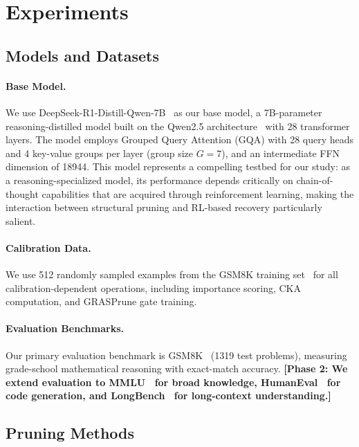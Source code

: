 
\section{Experiments}

\subsection{Models and Datasets}

\paragraph{Base Model.}
We use DeepSeek-R1-Distill-Qwen-7B~\citep{deepseek2025r1} as our base model, a 7B-parameter reasoning-distilled model built on the Qwen2.5 architecture~\citep{qwen2.5} with 28 transformer layers.
The model employs Grouped Query Attention (GQA) with 28 query heads and 4 key-value groups per layer (group size $G{=}7$), and an intermediate FFN dimension of 18944.
This model represents a compelling testbed for our study: as a reasoning-specialized model, its performance depends critically on chain-of-thought capabilities that are acquired through reinforcement learning, making the interaction between structural pruning and RL-based recovery particularly salient.

\paragraph{Calibration Data.}
We use 512 randomly sampled examples from the GSM8K training set~\citep{cobbe2021gsm8k} for all calibration-dependent operations, including importance scoring, CKA computation, and GRASPrune gate training.

\paragraph{Evaluation Benchmarks.}
Our primary evaluation benchmark is GSM8K~\citep{cobbe2021gsm8k} (1319 test problems), measuring grade-school mathematical reasoning with exact-match accuracy.
\textbf{[Phase 2: We extend evaluation to MMLU~\citep{hendrycks2021mmlu} for broad knowledge, HumanEval~\citep{chen2021humaneval} for code generation, and LongBench~\citep{bai2024longbench} for long-context understanding.]}

\subsection{Pruning Methods}

